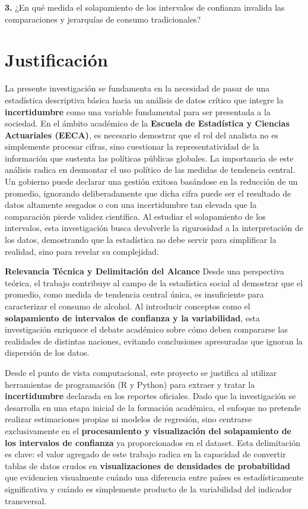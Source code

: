 \documentclass[oneside,11pt]{Latex/Classes/PhDthesisPSnPDF}
\begin{document}
\textbf{3.} ¿En qué medida el solapamiento de los intervalos de
confianza invalida las comparaciones y jerarquías de consumo
tradicionales?\\

\section{Justificación}

La presente investigación se fundamenta en la necesidad de pasar de una
estadística descriptiva básica hacia un análisis de datos crítico que
integre la \textbf{incertidumbre} como una variable fundamental para ser
presentada a la sociedad. En el ámbito académico de la \textbf{Escuela
de Estadística y Ciencias Actuariales (EECA)}, es necesario demostrar
que el rol del analista no es simplemente procesar cifras, sino
cuestionar la representatividad de la información que sustenta las
políticas públicas globales. La importancia de este análisis radica en
desmontar el uso político de las medidas de tendencia central. Un
gobierno puede declarar una gestión exitosa basándose en la reducción de
un promedio, ignorando deliberadamente que dicha cifra puede ser el
resultado de datos altamente sesgados o con una incertidumbre tan
elevada que la comparación pierde validez científica. Al estudiar el
solapamiento de los intervalos, esta investigación busca devolverle la
rigurosidad a la interpretación de los datos, demostrando que la
estadística no debe servir para simplificar la realidad, sino para
revelar su complejidad.

\textbf{Relevancia Técnica y Delimitación del Alcance} Desde una
perspectiva teórica, el trabajo contribuye al campo de la estadística
social al demostrar que el promedio, como medida de tendencia central
única, es insuficiente para caracterizar el consumo de alcohol. Al
introducir conceptos como el \textbf{solapamiento de intervalos de
confianza y la variabilidad}, esta investigación enriquece el debate
académico sobre cómo deben compararse las realidades de distintas
naciones, evitando conclusiones apresuradas que ignoran la dispersión de
los datos.

Desde el punto de vista computacional, este proyecto se justifica al
utilizar herramientas de programación (R y Python) para extraer y tratar
la \textbf{incertidumbre} declarada en los reportes oficiales. Dado que
la investigación se desarrolla en una etapa inicial de la formación
académica, el enfoque no pretende realizar estimaciones propias ni
modelos de regresión, sino centrarse exclusivamente en el
\textbf{procesamiento y visualización del solapamiento de los intervalos
de confianza} ya proporcionados en el dataset. Esta delimitación es
clave: el valor agregado de este trabajo radica en la capacidad de
convertir tablas de datos crudos en \textbf{visualizaciones de
densidades de probabilidad} que evidencien visualmente cuándo una
diferencia entre países es estadísticamente significativa y cuándo es
simplemente producto de la variabilidad del indicador transversal.
\end{document}
